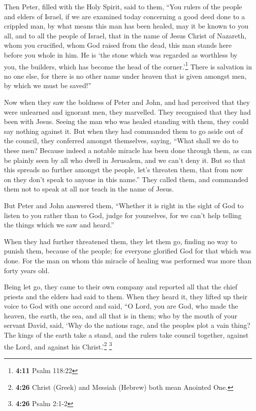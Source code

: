  Then Peter, filled with the Holy Spirit, said to them,
``You rulers of the people and elders of Israel,  if we
are examined today concerning a good deed done to a crippled man, by
what means this man has been healed,  may it be known to
you all, and to all the people of Israel, that in the name of Jesus
Christ of Nazareth, whom you crucified, whom God raised from the dead,
this man stands here before you whole in him.  He is `the
stone which was regarded as worthless by you, the builders, which has
become the head of the corner.'\footnote{\textbf{4:11} Psalm 118:22}
 There is salvation in no one else, for there is no other
name under heaven that is given amongst men, by which we must be
saved!''

 Now when they saw the boldness of Peter and John, and
had perceived that they were unlearned and ignorant men, they marvelled.
They recognised that they had been with Jesus.  Seeing
the man who was healed standing with them, they could say nothing
against it.  But when they had commanded them to go aside
out of the council, they conferred amongst themselves, 
saying, ``What shall we do to these men? Because indeed a notable
miracle has been done through them, as can be plainly seen by all who
dwell in Jerusalem, and we can't deny it.  But so that
this spreads no further amongst the people, let's threaten them, that
from now on they don't speak to anyone in this name.'' 
They called them, and commanded them not to speak at all nor teach in
the name of Jesus.

 But Peter and John answered them, ``Whether it is right
in the sight of God to listen to you rather than to God, judge for
yourselves,  for we can't help telling the things which
we saw and heard.''

 When they had further threatened them, they let them go,
finding no way to punish them, because of the people; for everyone
glorified God for that which was done.  For the man on
whom this miracle of healing was performed was more than forty years
old.

 Being let go, they came to their own company and
reported all that the chief priests and the elders had said to them.
 When they heard it, they lifted up their voice to God
with one accord and said, ``O Lord, you are God, who made the heaven,
the earth, the sea, and all that is in them;  who by the
mouth of your servant David, said, `Why do the nations rage, and the
peoples plot a vain thing?  The kings of the earth take a
stand, and the rulers take council together, against the Lord, and
against his Christ.'\footnote{\textbf{4:26} Christ (Greek) and Messiah
  (Hebrew) both mean Anointed One.} \footnote{\textbf{4:26} Psalm 2:1-2}


